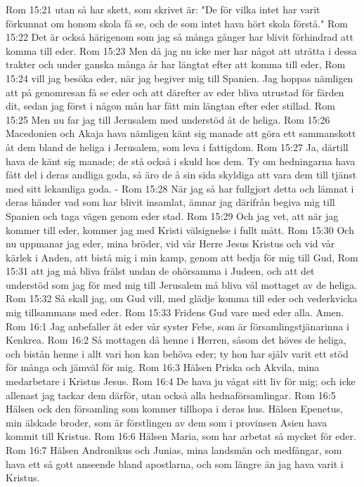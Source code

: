 Rom 15:21  utan så har skett, som skrivet är: "De för vilka intet har varit förkunnat om honom skola få se, och de som intet hava hört skola förstå."
Rom 15:22  Det är också härigenom som jag så många gånger har blivit förhindrad att komma till eder.
Rom 15:23  Men då jag nu icke mer har något att uträtta i dessa trakter och under ganska många år har längtat efter att komma till eder,
Rom 15:24  vill jag besöka eder, när jag begiver mig till Spanien. Jag hoppas nämligen att på genomresan få se eder och att därefter av eder bliva utrustad för färden dit, sedan jag först i någon mån har fått min längtan efter eder stillad.
Rom 15:25  Men nu far jag till Jerusalem med understöd åt de heliga.
Rom 15:26  Macedonien och Akaja hava nämligen känt sig manade att göra ett sammanskott åt dem bland de heliga i Jerusalem, som leva i fattigdom.
Rom 15:27  Ja, därtill hava de känt sig manade; de stå också i skuld hos dem. Ty om hedningarna hava fått del i deras andliga goda, så äro de å sin sida skyldiga att vara dem till tjänst med sitt lekamliga goda. -
Rom 15:28  När jag så har fullgjort detta och lämnat i deras händer vad som har blivit insamlat, ämnar jag därifrån begiva mig till Spanien och taga vägen genom eder stad.
Rom 15:29  Och jag vet, att när jag kommer till eder, kommer jag med Kristi välsignelse i fullt mått.
Rom 15:30  Och nu uppmanar jag eder, mina bröder, vid vår Herre Jesus Kristus och vid vår kärlek i Anden, att bistå mig i min kamp, genom att bedja för mig till Gud,
Rom 15:31  att jag må bliva frälst undan de ohörsamma i Judeen, och att det understöd som jag för med mig till Jerusalem må bliva väl mottaget av de heliga.
Rom 15:32  Så skall jag, om Gud vill, med glädje komma till eder och vederkvicka mig tillsammans med eder.
Rom 15:33  Fridens Gud vare med eder alla. Amen.
Rom 16:1  Jag anbefaller åt eder vår syster Febe, som är församlingstjänarinna i Kenkrea.
Rom 16:2  Så mottagen då henne i Herren, såsom det höves de heliga, och bistån henne i allt vari hon kan behöva eder; ty hon har själv varit ett stöd för många och jämväl för mig.
Rom 16:3  Hälsen Priska och Akvila, mina medarbetare i Kristus Jesus.
Rom 16:4  De hava ju vågat sitt liv för mig; och icke allenast jag tackar dem därför, utan också alla hednaförsamlingar.
Rom 16:5  Hälsen ock den församling som kommer tillhopa i deras hus. Hälsen Epenetus, min älskade broder, som är förstlingen av dem som i provinsen Asien hava kommit till Kristus.
Rom 16:6  Hälsen Maria, som har arbetat så mycket för eder.
Rom 16:7  Hälsen Andronikus och Junias, mina landsmän och medfångar, som hava ett så gott anseende bland apostlarna, och som längre än jag hava varit i Kristus.
